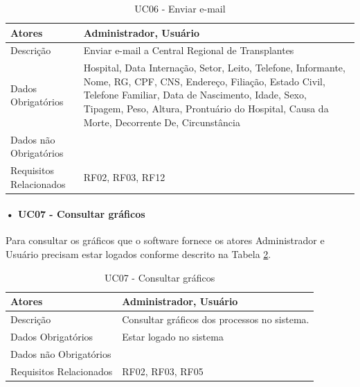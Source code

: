 \documentclass[portuguese,oneside]{tcc}
\begin{document}
\begin{table}
\centering
\caption{UC06 - Enviar e-mail} \label{table:uc06}
\begin{tabular}{ |p{5cm}|p{5cm}|  }
\hline
Atores & 
Administrador, Usuário\\

\hline
Descrição & 
 
Enviar e-mail a Central Regional de Transplantes
 \\

\hline
Dados Obrigatórios & 
Hospital, Data Internação, Setor, Leito, Telefone, Informante, Nome, RG, CPF, CNS, Endereço, Filiação, Estado Civil, Telefone Familiar, Data de Nascimento, Idade, Sexo, Tipagem, Peso, Altura, Prontuário do Hospital, Causa da Morte, Decorrente De, Circunstância
 \\

\hline
Dados não Obrigatórios & 

 \\

\hline
Requisitos Relacionados & 
RF02, RF03, RF12
 \\

\hline
\end{tabular}
\end{table}



\paragraph*{• UC07 - Consultar gráficos}
Para consultar os gráficos que o software fornece os atores Administrador e Usuário precisam estar logados conforme descrito na Tabela \ref{table:uc07}. 

\begin{table}
\centering
\caption{UC07 - Consultar gráficos} \label{table:uc07}
\begin{tabular}{ |p{5cm}|p{5cm}|  }

\hline
Atores & 
Administrador, Usuário\\

\hline
Descrição & 
 
Consultar gráficos dos processos no sistema.
 \\

\hline
Dados Obrigatórios & Estar logado no sistema
 \\

\hline
Dados não Obrigatórios & 
 \\

\hline
Requisitos Relacionados & 
RF02, RF03, RF05
 \\

\hline

\end{tabular}
\end{table}
\end{document}
